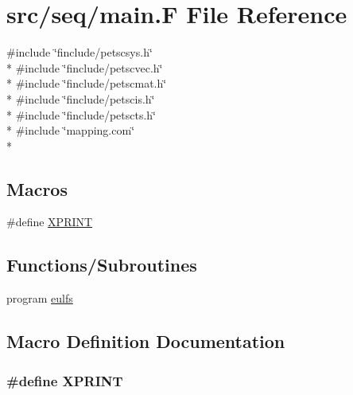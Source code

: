 \hypertarget{seq_2main_8_f}{\section{src/seq/main.F File Reference}
\label{seq_2main_8_f}
}
{\ttfamily \#include \char`\"{}finclude/petscsys.\-h\char`\"{}}\\*
{\ttfamily \#include \char`\"{}finclude/petscvec.\-h\char`\"{}}\\*
{\ttfamily \#include \char`\"{}finclude/petscmat.\-h\char`\"{}}\\*
{\ttfamily \#include \char`\"{}finclude/petscis.\-h\char`\"{}}\\*
{\ttfamily \#include \char`\"{}finclude/petscts.\-h\char`\"{}}\\*
{\ttfamily \#include \char`\"{}mapping.\-com\char`\"{}}\\*
\subsection*{Macros}
\begin{DoxyCompactItemize}
\item 
\#define \hyperlink{seq_2main_8_f_ab756f1b26b556714e9a9789d8f2d8f08}{X\-P\-R\-I\-N\-T}
\end{DoxyCompactItemize}
\subsection*{Functions/\-Subroutines}
\begin{DoxyCompactItemize}
\item 
program \hyperlink{seq_2main_8_f_a8d200d2db3a3c1292d026e24f74c02e3}{eulfs}
\end{DoxyCompactItemize}


\subsection{Macro Definition Documentation}
\hypertarget{seq_2main_8_f_ab756f1b26b556714e9a9789d8f2d8f08}{
\subsubsection[{X\-P\-R\-I\-N\-T}]{\setlength{\rightskip}{0pt plus 5cm}\#define X\-P\-R\-I\-N\-T}}\label{seq_2main_8_f_ab756f1b26b556714e9a9789d8f2d8f08}


